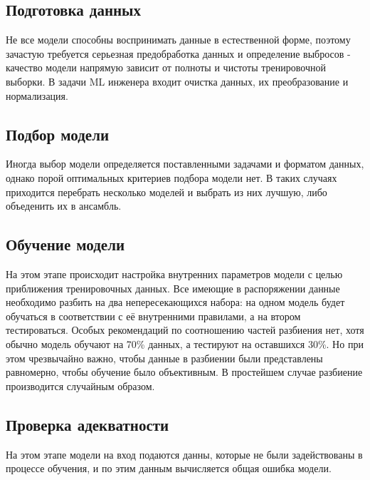 \documentclass{article}
\begin{document}
    \subsection*{Подготовка данных}
        Не все модели способны воспринимать данные в естественной форме, поэтому зачастую требуется серьезная предобработка данных и определение выбросов - качество модели напрямую зависит от полноты и чистоты тренировочной выборки. В задачи ML инженера входит очистка данных, их преобразование и нормализация.
        
    \subsection*{Подбор модели}
        Иногда выбор модели определяется поставленными задачами и форматом данных, однако порой оптимальных критериев подбора модели нет. В таких случаях приходится перебрать несколько моделей и выбрать из них лучшую, либо объеденить их в ансамбль.
        
    \subsection*{Обучение модели}
        На этом этапе происходит настройка внутренних параметров модели с целью приближения тренировочных данных. Все имеющие в распоряжении данные необходимо разбить на два непересекающихся набора: на одном модель будет обучаться в соответствии с её внутренними правилами, а на втором тестироваться. Особых рекомендаций по соотношению частей разбиения нет, хотя обычно модель обучают на 70\% данных, а тестируют на оставшихся 30\%. Но при этом чрезвычайно важно, чтобы данные в разбиении были представлены равномерно, чтобы обучение было объективным. В простейшем случае разбиение производится случайным образом.
        
    \subsection*{Проверка адекватности}
        На этом этапе модели на вход подаются данны, которые не были задействованы в процессе обучения, и по этим данным вычисляется общая ошибка модели.
        
\end{document}
